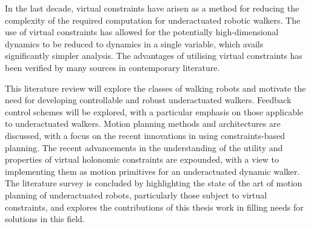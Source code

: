In the last decade, virtual constraints have arisen as a method for reducing the complexity of the required computation for underactuated robotic walkers. The use of virtual constraints has allowed for the potentially high-dimensional dynamics to be reduced to dynamics in a single variable, which avails significantly simpler analysis. The advantages of utilising virtual constraints has been verified by many sources in contemporary literature.

This literature review will explore the classes of walking robots and motivate the need for developing controllable and robust underactuated walkers. Feedback control schemes will be explored, with a particular emphasis on those applicable to underactuated walkers. Motion planning methods and architectures are discussed, with a focus on the recent innovations in using constraints-based planning. The recent advancements in the understanding of the utility and properties of virtual holonomic constraints are expounded, with a view to implementing them as motion primitives for an underactuated dynamic walker. The literature survey is concluded by highlighting the state of the art of motion planning of underactuated robots, particularly those subject to virtual constraints, and explores the contributions of this thesis work in filling needs for solutions in this field.